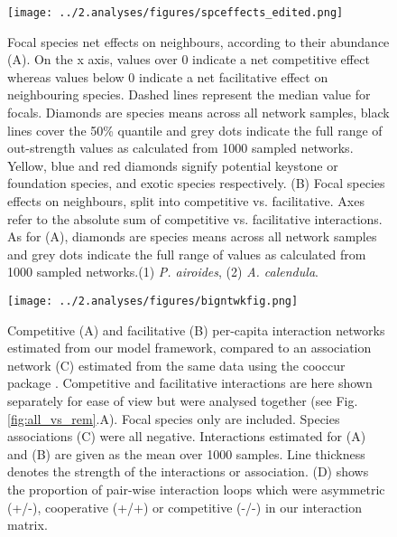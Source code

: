 \documentclass[a4,12pt]{article}
\begin{document}
    \begin{figure}[!h]
        \begin{centering}
        \texttt{[image: ../2.analyses/figures/spceffects\_edited.png]}
        \caption{Focal species net effects on neighbours, according to their abundance (A). On the x axis, values over 0 indicate a net competitive effect whereas values below 0 indicate a net facilitative effect on neighbouring species. Dashed lines represent the median value for focals. Diamonds are species means across all network samples, black lines cover the 50\% quantile and grey dots indicate the full range of out-strength values as calculated from 1000 sampled networks. Yellow, blue and red diamonds signify potential keystone or foundation species, and exotic species respectively. (B) Focal species effects on neighbours, split into competitive vs. facilitative. Axes refer to the absolute sum of competitive vs. facilitative interactions. As for (A), diamonds are species means across all network samples and grey dots indicate the full range of  values as calculated from 1000 sampled networks.(1) \textit{P. airoides}, (2) \textit{A. calendula}.}
        \label{fig:species}
        \end{centering}
    \end{figure} 





    \newpage

    \begin{figure}[H]
        \texttt{[image: ../2.analyses/figures/bigntwkfig.png]}
        \caption{Competitive (A) and facilitative (B) per-capita interaction networks estimated from our model framework, compared to an association network (C) estimated from the same data using the cooccur package \parencite{Griffith2016}. Competitive and facilitative interactions are here shown separately for ease of view but were analysed together (see Fig. \ref{fig:all_vs_rem}.A). Focal species only are included. Species associations (C) were all negative.  Interactions estimated for (A) and (B) are given as the mean over 1000 samples. Line thickness denotes the strength of the interactions or association. (D) shows the proportion of pair-wise interaction loops which were asymmetric (+/-), cooperative (+/+) or competitive (-/-) in our interaction matrix.}
        \label{fig:netwks}
    \end{figure}    
\end{document}

